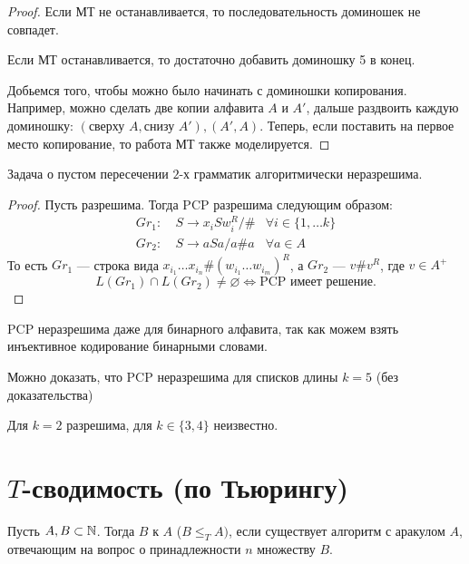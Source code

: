 \begin{proof}
	Если МТ не останавливается, то последовательность доминошек не совпадет.

	Если МТ останавливается, то достаточно добавить доминошку  5 в конец.

	Добьемся того, чтобы можно было начинать с доминошки копирования. 
	Например, можно сделать две копии алфавита $ A$ и $ A'$, дальше раздвоить каждую доминошку: $ (\text{сверху }A, \text{снизу }A'), (A', A)$. Теперь, если поставить на первое место копирование,  то работа МТ также моделируется.
\end{proof}


\begin{cor}
    Задача о пустом пересечении $ 2$-х грамматик алгоритмически неразрешима.
\end{cor}
\begin{proof}
	Пусть разрешима. Тогда  PCP разрешима следующим образом:
	\[
	\begin{aligned}
		Gr_1 \colon~& S \to  x_i S w_i^R / \# & \forall i \in \{1, \ldots k\} \\
		Gr_2 \colon~& S \to  a S a / a\#a & \forall a \in A
	\end{aligned}
	\]
	То есть $ Gr_1$ --- строка вида $  x_{i_1} \ldots x_{i_n} \# (w_{i_1}\ldots w_{i_{m}})^{R}$, а  $ Gr_2$ --- $ v\#v ^{R}$, где $ v \in A^{+}$
	\[
		L(Gr_1) \cap L(Gr_2) \ne  \varnothing \Longleftrightarrow \text{PCP имеет решение}
	.\] 
\end{proof}

\begin{note}
    PCP неразрешима даже для бинарного алфавита, так как можем взять инъективное кодирование бинарными словами.
\end{note}
\begin{note}
	Можно доказать, что PCP неразрешима для списков длины $ k = 5$ (без доказательства)
\end{note}
\begin{note}
    Для $k= 2$ разрешима, для $ k \in \{3, 4\}$ неизвестно.
\end{note}

\section{$T$-сводимость (по Тьюрингу)}
\begin{defn} 
	Пусть $ A, B \subset \mathbb{N}$. Тогда $ B$  к $ A$ ($ B \le _{T}  A)$, если существует алгоритм с аракулом $ A$, отвечающим на вопрос о принадлежности  $ n $ множеству $ B$.
\end{defn}


